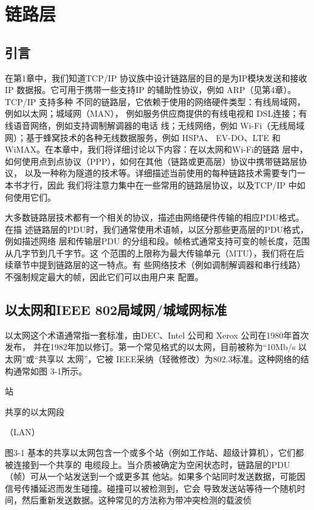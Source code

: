 \chapter{链路层}

\section{引言}

在第1章中，我们知道TCP/IP 协议族中设计链路层的目的是为IP模块发送和接收IP
数据报。它可用于携带一些支持IP 的辅助性协议，例如 ARP（见第4章）。TCP/IP 支持多种
不同的链路层，它依赖于使用的网络硬件类型：有线局域网，例如以太网；城域网（MAN），
例如服务供应商提供的有线电视和 DSL连接；有线语音网络，例如支持调制解调器的电话
线；无线网络，例如 Wi-Fi（无线局域网）；基于蜂窝技术的各种无线数据服务，例如 HSPA、
EV-DO、LTE 和 WiMAX。在本章中，我们将详细讨论以下内容：在以太网和Wi-Fi的链路
层中，如何使用点到点协议（PPP），如何在其他（链路或更高层）协议中携带链路层协议，
以及一种称为隧道的技术等。详细描述当前使用的每种链路技术需要专门一本书才行，因此
我们将注意力集中在一些常用的链路层协议，以及TCP/IP 中如何使用它们。

大多数链路层技术都有一个相关的协议，描述由网络硬件传输的相应PDU格式。在描
述链路层的PDU时，我们通常使用术语帧，以区分那些更高层的PDU格式，例如描述网络
层和传输层PDU 的分组和段。帧格式通常支持可变的帧长度，范围从几字节到几千字节。这
个范围的上限称为最大传输单元（MTU），我们将在后续章节中提到链路层的这一特点。有
些网络技术（例如调制解调器和串行线路）不强制规定最大的帧，因此它们可以由用户来
配置。

\section{以太网和IEEE 802局域网/城域网标准}

以太网这个术语通常指一套标准，由DEC、Intel 公司和 Xerox 公司在1980年首次发布，
并在1982年加以修订。第一个常见格式的以太网，目前被称为“10Mb/s 以太网”或“共享以
太网”，它被 IEEE采纳（轻微修改）为802.3标准。这种网络的结构通常如图 3-1所示。

站

共享的以太网段

（LAN）

图3-1 基本的共享以太网包含一个或多个站（例如工作站、超级计算机），它们都被连接到一个共享的
电缆段上。当介质被确定为空闲状态时，链路层的PDU（帧）可从一个站发送到一个或更多其
他站。如果多个站同时发送数据，可能因信号传播延迟而发生碰撞。碰撞可以被检测到，它会
导致发送站等待一个随机时间，然后重新发送数据。这种常见的方法称为带冲突检测的载波侦

